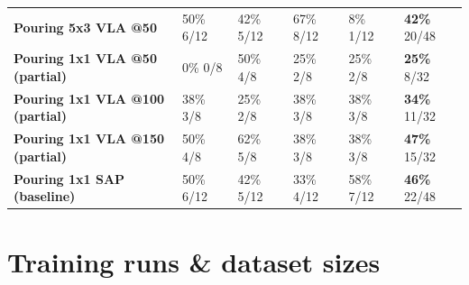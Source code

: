 \documentclass[10pt]{article}
\begin{document}
\begin{table}[ht]
\begin{tabular}{>{\raggedright\arraybackslash}p{3.6cm}C{2.15cm}C{2.15cm}C{2.15cm}C{2.15cm}C{2.15cm}}
\textbf{Pouring 5x3 VLA @50} & 50\% {\tiny 6/12} & 42\% {\tiny 5/12} & 67\% {\tiny 8/12} & 8\% {\tiny 1/12} & \textbf{42\%} {\tiny 20/48} \\
\textbf{Pouring 1x1 VLA @50 (partial)} & 0\% {\tiny 0/8} & 50\% {\tiny 4/8} & 25\% {\tiny 2/8} & 25\% {\tiny 2/8} & \textbf{25\%} {\tiny 8/32} \\
\textbf{Pouring 1x1 VLA @100 (partial)} & 38\% {\tiny 3/8} & 25\% {\tiny 2/8} & 38\% {\tiny 3/8} & 38\% {\tiny 3/8} & \textbf{34\%} {\tiny 11/32} \\
\textbf{Pouring 1x1 VLA @150 (partial)} & 50\% {\tiny 4/8} & 62\% {\tiny 5/8} & 38\% {\tiny 3/8} & 38\% {\tiny 3/8} & \textbf{47\%} {\tiny 15/32} \\
\textbf{Pouring 1x1 SAP (baseline)} & 50\% {\tiny 6/12} & 42\% {\tiny 5/12} & 33\% {\tiny 4/12} & 58\% {\tiny 7/12} & \textbf{46\%} {\tiny 22/48} \\
\bottomrule
\end{tabular}
\end{table}


\FloatBarrier
\section*{Training runs \& dataset sizes}
\end{document}
